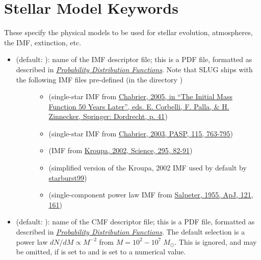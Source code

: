 \documentclass[letterpaper,10pt,english]{sphinxmanual}
\begin{document}
\section{Stellar Model Keywords}
\label{parameters:stellar-model-keywords}\label{parameters:ssec-stellar-keywords}
These specify the physical models to be used for stellar evolution, atmospheres, the IMF, extinction, etc.
\begin{itemize}
\item {} \begin{description}
\item[{ (default: ): name of the IMF descriptor file; this is a PDF file, formatted as described in {\hyperref[pdfs:sec-pdfs]{\emph{Probability Distribution Functions}}}. Note that SLUG ships with the following IMF files pre-defined (in the directory )}] \leavevmode\begin{itemize}
\item {} 
 (single-star IMF from \href{http://adsabs.harvard.edu/abs/2005ASSL..327...41C}{Chabrier, 2005, in ``The Initial Mass Function 50 Years Later'', eds. E. Corbelli, F. Palla, \& H. Zinnecker, Springer: Dordrecht, p. 41})

\item {} 
 (single-star IMF from \href{http://adsabs.harvard.edu/abs/2003PASP..115..763C}{Chabrier, 2003, PASP, 115, 763-795})

\item {} 
 (IMF from \href{http://adsabs.harvard.edu/abs/2002Sci...295...82K}{Kroupa, 2002, Science, 295, 82-91})

\item {} 
 (simplified version of the Kroupa, 2002 IMF used by default by \href{http://www.stsci.edu/science/starburst99/docs/default.htm}{starburst99})

\item {} 
 (single-component power law IMF from \href{http://adsabs.harvard.edu/abs/1955ApJ...121..161S}{Salpeter, 1955, ApJ, 121, 161})

\end{itemize}

\end{description}

\item {} 
 (default: ): name of the CMF descriptor file; this is a PDF file, formatted as described in {\hyperref[pdfs:sec-pdfs]{\emph{Probability Distribution Functions}}}. The default selection is a power law \(dN/dM \propto M^{-2}\) from \(M = 10^2 - 10^7\;M_\odot\). This is ignored, and may be omitted, if  is set to  and  is set to a numerical value.


\end{itemize}
\end{document}
